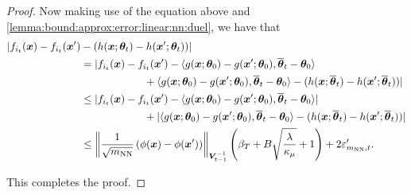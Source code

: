 \begin{proof}
	Now making use of the equation above and \cref{lemma:bound:approx:error:linear:nn:duel}, we have that 
	\begin{equation}
    \begin{split}
		|f_{i_t}(\boldsymbol{x}) - f_{i_t}(\boldsymbol{x}') &- (h(\boldsymbol{x};\boldsymbol{\theta}_t) - h(\boldsymbol{x}';\boldsymbol{\theta}_t))| \\
		&= | f_{i_t}(\boldsymbol{x}) - f_{i_t}(\boldsymbol{x}') - \langle g(\boldsymbol{x};\boldsymbol{\theta}_0) - g(\boldsymbol{x}';\boldsymbol{\theta}_0), \overline{\boldsymbol{\theta}}_t - \boldsymbol{\theta}_0 \rangle \\
		&\qquad\qquad\qquad + \langle g(\boldsymbol{x};\boldsymbol{\theta}_0) - g(\boldsymbol{x}';\boldsymbol{\theta}_0), \overline{\boldsymbol{\theta}}_t - \boldsymbol{\theta}_0 \rangle - (h(\boldsymbol{x};\overline{\boldsymbol{\theta}}_t) - h(\boldsymbol{x}';\overline{\boldsymbol{\theta}}_t)) |\\
        &\leq | f_{i_t}(\boldsymbol{x}) - f_{i_t}(\boldsymbol{x}') - \langle g(\boldsymbol{x};\boldsymbol{\theta}_0) - g(\boldsymbol{x}';\boldsymbol{\theta}_0), \overline{\boldsymbol{\theta}}_t - \boldsymbol{\theta}_0 \rangle | \\
		&\qquad\qquad\qquad + |\langle g(\boldsymbol{x};\boldsymbol{\theta}_0) - g(\boldsymbol{x}';\boldsymbol{\theta}_0), \overline{\boldsymbol{\theta}}_t - \boldsymbol{\theta}_0 \rangle - (h(\boldsymbol{x};\overline{\boldsymbol{\theta}}_t) - h(\boldsymbol{x}';\overline{\boldsymbol{\theta}}_t)) |\\
		&\leq \left\| \frac{1}{\sqrt{m_{\text{NN}}}}\left(\phi(\boldsymbol{x})-\phi(\boldsymbol{x}')\right) \right\|_{\boldsymbol{V}_{t-1}^{-1}} \left( \beta_T + B \sqrt{\frac{\lambda}{\kappa_\mu}} + 1 \right) + 2\varepsilon'_{m_{\text{NN}},t}.\\
    \end{split}
    \end{equation}
	
	This completes the proof.
\end{proof}

